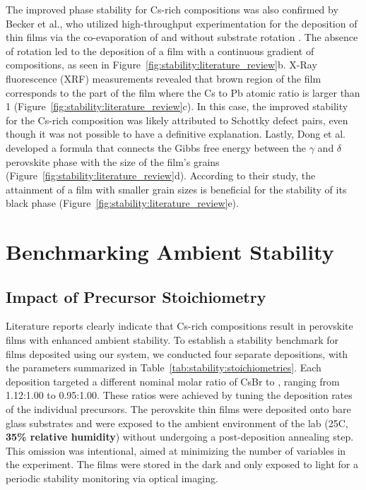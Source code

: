  The improved phase stability for Cs-rich compositions was also confirmed by Becker et al., who utilized high-throughput experimentation for the deposition of  thin films via the co-evaporation of  and  without substrate rotation \cite{Becker2019LowExperimentation}. The absence of rotation led to the deposition of a film with a continuous gradient of compositions, as seen in Figure~\ref{fig:stability:literature_review}b. X-Ray fluorescence (XRF) measurements revealed that brown region of the film corresponds to the part of the film where the Cs to Pb atomic ratio is larger than 1 (Figure~\ref{fig:stability:literature_review}c). In this case, the improved stability for the Cs-rich composition was likely attributed to Schottky defect pairs, even though it was not possible to have a definitive explanation. Lastly, Dong et al. developed a formula that connects the Gibbs free energy between the $\gamma$ and $\delta$ perovskite phase with the size of the film's grains (Figure~\ref{fig:stability:literature_review}d). According to their study, the attainment of a film with smaller grain sizes is beneficial for the stability of its black phase (Figure~\ref{fig:stability:literature_review}e).  

 

\section{Benchmarking Ambient Stability}

\subsection{Impact of Precursor Stoichiometry}

Literature reports clearly indicate that Cs-rich compositions result in perovskite films with enhanced ambient stability. To establish a stability benchmark for films deposited using our system, we conducted four separate depositions, with the parameters summarized in Table~\ref{tab:stability:stoichiometries}. Each deposition targeted a different nominal molar ratio of CsBr to , ranging from 1.12:1.00 to 0.95:1.00. These ratios were achieved by tuning the deposition rates of the individual precursors. The perovskite thin films were deposited onto bare glass substrates and were exposed to the ambient environment of the lab (25\degree C, \textbf{35\% relative humidity}) without undergoing a post-deposition annealing step. This omission was intentional, aimed at minimizing the number of variables in the experiment. The films were stored in the dark and only exposed to light for a periodic stability monitoring via optical imaging.



